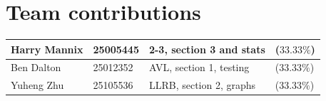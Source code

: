 \documentclass[12pt]{article}
\begin{document}
\section{Team contributions}
\begin{tabular}{|l|l|l|l|}
\hline
Harry Mannix&  25005445&  2-3, section 3 and stats& ($33.33\%$)\\\hline
          Ben Dalton&            25012352&         AVL, section 1, testing&          ($33.33\%$)\\
\hline
 Yuheng Zhu& 25105536& LLRB, section 2, graphs&($33.33\%$)\\\hline
\end{tabular}
\vspace{-1em}
\printbibliography
\end{document}
